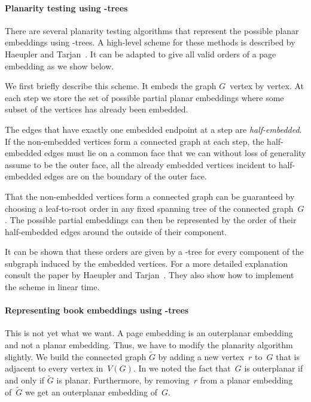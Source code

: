 \paragraph{Planarity testing using \PQ-trees}

There are several planarity testing algorithms that represent the possible planar
embeddings using \PQ-trees. A high-level scheme for these methods is
described by Haeupler and Tarjan~\cite{Haeupler08}. It can be adapted to give
all valid orders of a page embedding as we show below.

We first briefly describe this scheme. 
It embeds the graph $G$~vertex by vertex. At each step
we store the set of possible partial planar embeddings where some subset
of the vertices has already been embedded. 

The edges that have exactly 
one embedded endpoint at a step are \emph{half-embedded}. If the non-embedded
vertices form a connected graph at each step, the half-embedded edges must lie on a common face
that we can without loss of generality assume to be the outer face, \ie all the already embedded vertices incident to half-embedded edges are on the boundary of the outer face. 

That the non-embedded vertices form a connected graph can be guaranteed
by choosing a leaf-to-root order in any fixed spanning tree of the connected graph~$G$. The possible
partial embeddings can then be represented by the order of their half-embedded edges
around the outside of their component.
 
It can be shown that these orders are given by a \PQ-tree for every component of the subgraph
induced by the embedded vertices. For a more detailed explanation consult the
paper by Haeupler and Tarjan~\cite{Haeupler08}. They also show how to implement the
scheme in linear time.

\paragraph{Representing book embeddings using \PQ-trees}

This is not yet what we want. A page embedding is an outerplanar embedding and not a planar embedding.
Thus, we have to modify the planarity algorithm slightly. We build the connected graph $\widetilde{G}$ by
adding a new vertex~$r$ to~$G$ that is adjacent to every vertex in~$V(G)$. In  we noted the
fact that~$G$ is outerplanar if and only if $\widetilde{G}$ is planar. Furthermore, by removing~$r$
from a planar embedding of~$\widetilde{G}$ we get an outerplanar embedding of~$G$.


